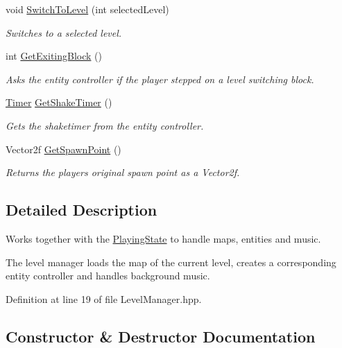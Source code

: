 \begin{DoxyCompactItemize}
void \hyperlink{class_level_manager_a9c892f8066fa089d7bbc665696bf37c4}{Switch\+To\+Level} (int selected\+Level)
\begin{DoxyCompactList}\small\item\em Switches to a selected level. \end{DoxyCompactList}\item 
int \hyperlink{class_level_manager_aa9423f5861e8eebc14b175da2a2fea91}{Get\+Exiting\+Block} ()
\begin{DoxyCompactList}\small\item\em Asks the entity controller if the player stepped on a level switching block. \end{DoxyCompactList}\item 
\hyperlink{struct_timer}{Timer} \hyperlink{class_level_manager_a8b08bd6bc69bf5877a0e159df5f51af8}{Get\+Shake\+Timer} ()
\begin{DoxyCompactList}\small\item\em Gets the shaketimer from the entity controller. \end{DoxyCompactList}\item 
Vector2f \hyperlink{class_level_manager_a6e8ba28b3df63a8babb0cb3551d5660c}{Get\+Spawn\+Point} ()
\begin{DoxyCompactList}\small\item\em Returns the player\textquotesingle{}s original spawn point as a Vector2f. \end{DoxyCompactList}\end{DoxyCompactItemize}


\subsection{Detailed Description}
Works together with the \hyperlink{class_playing_state}{Playing\+State} to handle maps, entities and music. 

The level manager loads the map of the current level, creates a corresponding entity controller and handles background music. 

Definition at line 19 of file Level\+Manager.\+hpp.



\subsection{Constructor \& Destructor Documentation}
\mbox{\label{class_level_manager_ab420f045161c3663356be1f3d8b1e50d}} 
